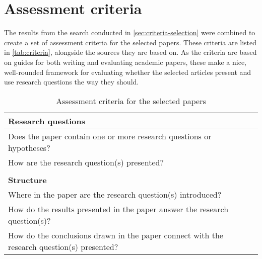 \section{Assessment criteria}
\label{sec:criteria}

The results from the search conducted in \autoref{sec:criteria-selection} were combined to create a set of assessment criteria for the selected papers. These criteria are listed in \autoref{tab:criteria}, alongside the sources they are based on. As the criteria are based on guides for both writing and evaluating academic papers, these make a nice, well-rounded framework for evaluating whether the selected articles present and use research questions the way they should.

\begin{table*}[ht]
    \centering
    \begin{tabular}{p{} p{}}
        \textbf{Research questions} \\
        \hline
        Does the paper contain one or more research questions or hypotheses? & \cite{Rosenfeldt_2000,Jha_2014,Lin_2012,Davidson_2012,Cuschieri_2019,Katz_2006,Martenson_2016} \\
        How are the research question(s) presented? & \cite{Rosenfeldt_2000,Jha_2014,Lin_2012,Davidson_2012,Cuschieri_2019,Katz_2006} \\
        \\
        
        \textbf{Structure} \\
        \hline
        Where in the paper are the research question(s) introduced? & \cite{Rosenfeldt_2000,Jha_2014,Lin_2012,Davidson_2012,Cuschieri_2019,Katz_2006} \\
        How do the results presented in the paper answer the research question(s)? & \cite{Jha_2014,Davidson_2012,Cuschieri_2019,Katz_2006,Martenson_2016} \\
        How do the conclusions drawn in the paper connect with the research question(s) presented? & \cite{Davidson_2012,Katz_2006,Martenson_2016} \\
    \end{tabular}
    \caption{Assessment criteria for the selected papers}
    \label{tab:criteria}
\end{table*}